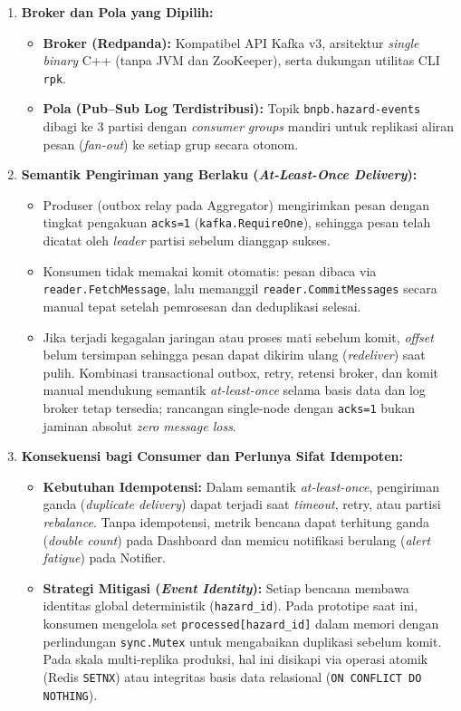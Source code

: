 \begin{enumerate}
    \item \textbf{Broker dan Pola yang Dipilih:}
    \begin{itemize}
        \item \textbf{Broker (Redpanda):} Kompatibel API Kafka v3, arsitektur \textit{single binary} C++ (tanpa JVM dan ZooKeeper), serta dukungan utilitas CLI \texttt{rpk}.
        \item \textbf{Pola (Pub--Sub Log Terdistribusi):} Topik \texttt{bnpb.hazard-events} dibagi ke 3 partisi dengan \textit{consumer groups} mandiri untuk replikasi aliran pesan (\textit{fan-out}) ke setiap grup secara otonom.
    \end{itemize}

    \item \textbf{Semantik Pengiriman yang Berlaku (\textit{At-Least-Once Delivery}):}
    \begin{itemize}
        \item Produser (outbox relay pada Aggregator) mengirimkan pesan dengan tingkat pengakuan \texttt{acks=1} (\texttt{kafka.RequireOne}), sehingga pesan telah dicatat oleh \textit{leader} partisi sebelum dianggap sukses.
        \item Konsumen tidak memakai komit otomatis: pesan dibaca via \texttt{reader.FetchMessage}, lalu memanggil \texttt{reader.CommitMessages} secara manual tepat setelah pemrosesan dan deduplikasi selesai.
        \item Jika terjadi kegagalan jaringan atau proses mati sebelum komit, \textit{offset} belum tersimpan sehingga pesan dapat dikirim ulang (\textit{redeliver}) saat pulih. Kombinasi transactional outbox, retry, retensi broker, dan komit manual mendukung semantik \textit{at-least-once} selama basis data dan log broker tetap tersedia; rancangan single-node dengan \texttt{acks=1} bukan jaminan absolut \textit{zero message loss}.
    \end{itemize}

    \item \textbf{Konsekuensi bagi Consumer dan Perlunya Sifat Idempoten:}
    \begin{itemize}
        \item \textbf{Kebutuhan Idempotensi:} Dalam semantik \textit{at-least-once}, pengiriman ganda (\textit{duplicate delivery}) dapat terjadi saat \textit{timeout}, retry, atau partisi \textit{rebalance}. Tanpa idempotensi, metrik bencana dapat terhitung ganda (\textit{double count}) pada Dashboard dan memicu notifikasi berulang (\textit{alert fatigue}) pada Notifier.
        \item \textbf{Strategi Mitigasi (\textit{Event Identity}):} Setiap bencana membawa identitas global deterministik (\texttt{hazard\_id}). Pada prototipe saat ini, konsumen mengelola set \texttt{processed[hazard\_id]} dalam memori dengan perlindungan \texttt{sync.Mutex} untuk mengabaikan duplikasi sebelum komit. Pada skala multi-replika produksi, hal ini disikapi via operasi atomik (Redis \texttt{SETNX}) atau integritas basis data relasional (\texttt{ON CONFLICT DO NOTHING}).
    \end{itemize}
\end{enumerate}
